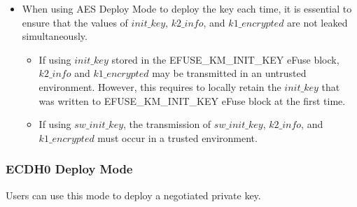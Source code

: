 \documentclass[main\_\_EN.tex]{subfiles}
\begin{document}
\begin{itemize}
\begin{itemize}
    \end{itemize}
    \item When using AES Deploy Mode to deploy the key each time, it is essential to ensure that the values of \begin{math}init\_key\end{math}, \begin{math}k2\_info\end{math}, and \begin{math}k1\_encrypted\end{math} are not leaked simultaneously.
    \begin{itemize}
        \item If using \begin{math}init\_key\end{math} stored in the EFUSE\_KM\_INIT\_KEY eFuse block, \begin{math}k2\_info\end{math} and \begin{math}k1\_encrypted\end{math} may be transmitted in an untrusted environment. However, this requires to locally retain the \begin{math}init\_key\end{math} that was written to EFUSE\_KM\_INIT\_KEY eFuse block at the first time.
        \item If using \begin{math}sw\_init\_key\end{math}, the transmission of \begin{math}sw\_init\_key\end{math}, \begin{math}k2\_info\end{math}, and \begin{math}k1\_encrypted\end{math} must occur in a trusted environment.
    \end{itemize}
\end{itemize}


\subsubsection{ECDH0 Deploy Mode}
Users can use this mode to deploy a negotiated private key.
\end{document}
